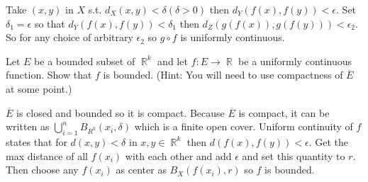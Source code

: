 \documentclass[12pt,letterpaper,boxed]{hmcpset}
\DeclareMathOperator{\R}{\mathbb{R}}
\begin{document}
\begin{solution}
Take $(x, y)$ in $X$ s.t. $d_X(x, y) < \delta (\delta > 0)$ then $d_Y(f(x), f(y)) < \epsilon.$ Set $\delta_1 = \epsilon$ so that $d_Y(f(x), f(y))<\delta_1$ then $d_Z(g(f(x)),g(f(y))) < \epsilon_2$.
So for any choice of arbitrary $\epsilon_2$ so $g \circ f$ is uniformly continuous.
\end{solution}


\begin{problem}[Exercise 2.41]
Let $E$ be a bounded subset of $\R^{k}$ and let $f : E \rightarrow \R$ be a uniformly continuous function. Show that $f$ is bounded. (Hint: You will need to use compactness of $\overline{E}$ at some point.)
\end{problem}

\begin{solution}
$\overline{E}$ is closed and bounded so it is compact. Because $\overline{E}$ is compact, it can be written as $\bigcup_{i = 1}^{n} B_{R^{k}}(x_i, \delta)$ which is a finite open cover. Uniform continuity of $f$ states that for $d(x,y) < \delta$ in $x, y \in \R^{k}$ then $d(f(x), f(y)) < \epsilon.$ Get the max distance of all $f(x_i)$ with each other and add $\epsilon$ and set this quantity to $r$. Then choose any $f(x_i)$ as center as $B_X(f(x_i), r)$ so $f$ is bounded. 
\end{solution}
\end{document}
